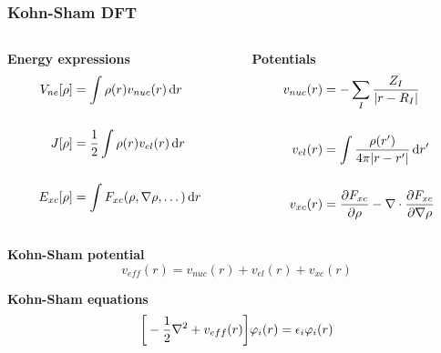 \begin{frame}
    \frametitle{Kohn-Sham DFT}
    \centering
    \begin{columns}
    \begin{column}{.50\textwidth}
    \centering
    \textbf{Energy expressions}
    \begin{align}
	\nonumber
	V_{ne}[\rho]	&= \int \rho(r)v_{nuc}(r)\,\mathrm{d} r\\
	\nonumber
			&\\
	\nonumber
	J[\rho] &= \frac{1}{2} \int \rho(r)v_{el}(r)\,\mathrm{d} r\\
	\nonumber
			&\\
	\nonumber
	E_{xc}[\rho]	&= \int F_{xc}(\rho, \nabla\rho, \dots) \,\mathrm{d} r
    \end{align}
    \end{column}
    \begin{column}{.50\textwidth}
    \centering
    \textbf{Potentials}
    \begin{align}
	\nonumber
	v_{nuc}(r) &=
        -\sum_I\frac{Z_I}{|r-R_I|}\\
	\nonumber
			&\\
	\nonumber
	v_{el}(r) &=
	\int \frac{\rho(r')}{4\pi|r-r'|} \,\mathrm{d} r'\\
	\nonumber
			&\\
	\nonumber
	v_{xc}(r) &=
        \frac{\partial F_{xc}}{\partial \rho} - \nabla \cdot \frac{\partial
        F_{xc}}{\partial \nabla \rho}
    \end{align}
    \end{column}
    \end{columns}    

    \vspace{5mm}

    \centering
    \textbf{Kohn-Sham potential}
    \begin{equation}
        \nonumber
        v_{eff}(r) = v_{nuc}(r) + v_{el}(r) + v_{xc}(r)
    \end{equation}


    \vspace{5mm}

    \centering
    \textbf{Kohn-Sham equations}
    \begin{equation}
	\nonumber
	\bigg[-\frac{1}{2}\nabla^2 + v_{eff}(r)\bigg]\varphi_i(r) = \epsilon_i \varphi_i(r)
    \end{equation}

\end{frame}

